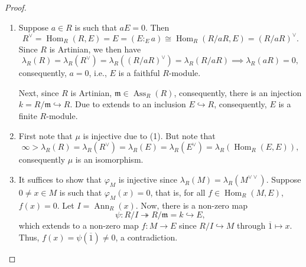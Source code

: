 \documentclass[10pt]{article}
\theoremstyle{thmstyle}
\theoremstyle{defstyle}
\newcommand{\Ann}{\operatorname{Ann}}
\newcommand{\Hom}{\operatorname{Hom}}
\newcommand{\frakm}{\mathfrak{m}} %
\newcommand{\onto}{\twoheadrightarrow}
\newcommand{\into}{\hookrightarrow}
\newcommand{\Ass}{\operatorname{Ass}}
\begin{document}
\begin{proof}
\begin{enumerate}[label=(\arabic*)]
    \item Suppose $a\in R$ is such that $aE = 0$. Then 
    \begin{equation*}
        R^\vee = \Hom_R(R, E) = E = (E :_E a)\cong\Hom_R\left(R/aR, E\right) = \left(R/aR\right)^\vee.
    \end{equation*}
    Since $R$ is Artinian, we then have 
    \begin{equation*}
        \lambda_R(R) = \lambda_R(R^\vee) = \lambda_R\left((R/aR)^\vee\right) = \lambda_R(R/aR)\implies\lambda_R(aR) = 0, 
    \end{equation*}
    consequently, $a = 0$, i.e., $E$ is a faithful $R$-module.

    Next, since $R$ is Artinian, $\frakm\in\Ass_R(R)$, consequently, there is an injection $k = R/\frakm\into R$. Due to  extends to an inclusion $E\into R$, consequently, $E$ is a finite $R$-module.

    \item First note that $\mu$ is injective due to (1). But note that 
    \begin{equation*}
        \infty > \lambda_R(R) = \lambda_R(R^\vee) = \lambda_R(E) = \lambda_R(E^\vee) = \lambda_R\left(\Hom_R(E, E)\right),
    \end{equation*}
    consequently $\mu$ is an isomorphism.

    \item It suffices to show that $\varphi_M$ is injective since $\lambda_R(M) = \lambda_R(M^{\vee\vee})$. Suppose $0\ne x\in M$ is such that $\varphi_M(x) = 0$, that is, for all $f\in\Hom_R(M, E)$, $f(x) = 0$. Let $I = \Ann_R(x)$. Now, there is a non-zero map 
    \begin{equation*}
        \psi: R/I\onto R/\frakm = k\into E,
    \end{equation*}
    which extends to a non-zero map $f: M\to E$ since $R/I\into M$ through $\overline 1\mapsto x$. Thus, $f(x) = \psi(\overline 1)\ne 0$, a contradiction. \qedhere
\end{enumerate}
\end{proof}
\end{document}
